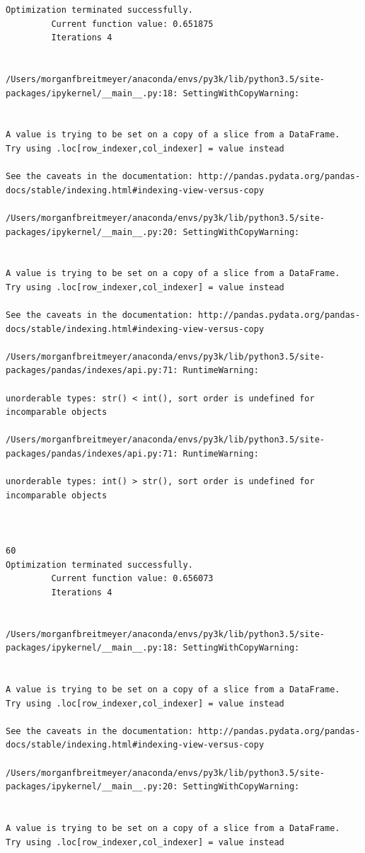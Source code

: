 \begin{lstlisting}
Optimization terminated successfully.
         Current function value: 0.651875
         Iterations 4


/Users/morganfbreitmeyer/anaconda/envs/py3k/lib/python3.5/site-packages/ipykernel/__main__.py:18: SettingWithCopyWarning:


A value is trying to be set on a copy of a slice from a DataFrame.
Try using .loc[row_indexer,col_indexer] = value instead

See the caveats in the documentation: http://pandas.pydata.org/pandas-docs/stable/indexing.html#indexing-view-versus-copy

/Users/morganfbreitmeyer/anaconda/envs/py3k/lib/python3.5/site-packages/ipykernel/__main__.py:20: SettingWithCopyWarning:


A value is trying to be set on a copy of a slice from a DataFrame.
Try using .loc[row_indexer,col_indexer] = value instead

See the caveats in the documentation: http://pandas.pydata.org/pandas-docs/stable/indexing.html#indexing-view-versus-copy

/Users/morganfbreitmeyer/anaconda/envs/py3k/lib/python3.5/site-packages/pandas/indexes/api.py:71: RuntimeWarning:

unorderable types: str() < int(), sort order is undefined for incomparable objects

/Users/morganfbreitmeyer/anaconda/envs/py3k/lib/python3.5/site-packages/pandas/indexes/api.py:71: RuntimeWarning:

unorderable types: int() > str(), sort order is undefined for incomparable objects



60
Optimization terminated successfully.
         Current function value: 0.656073
         Iterations 4


/Users/morganfbreitmeyer/anaconda/envs/py3k/lib/python3.5/site-packages/ipykernel/__main__.py:18: SettingWithCopyWarning:


A value is trying to be set on a copy of a slice from a DataFrame.
Try using .loc[row_indexer,col_indexer] = value instead

See the caveats in the documentation: http://pandas.pydata.org/pandas-docs/stable/indexing.html#indexing-view-versus-copy

/Users/morganfbreitmeyer/anaconda/envs/py3k/lib/python3.5/site-packages/ipykernel/__main__.py:20: SettingWithCopyWarning:


A value is trying to be set on a copy of a slice from a DataFrame.
Try using .loc[row_indexer,col_indexer] = value instead


\end{lstlisting}
